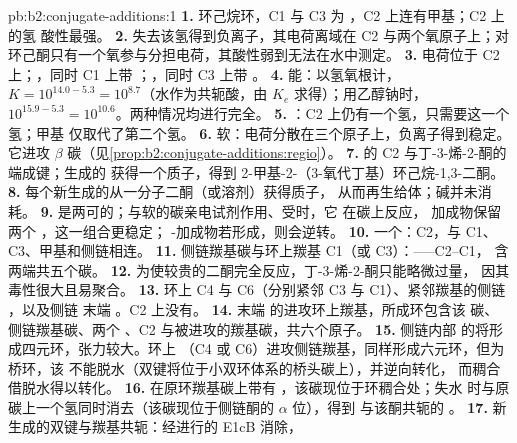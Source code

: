\begin{solution}{pb:b2:conjugate-additions:1}
\textbf{1.} 环己烷环，C1 与 C3 为 ，C2 上连有甲基；C2 上的氢
酸性最强。
\textbf{2.} 失去该氢得到负离子，其电荷离域在 C2 与两个氧原子上；对
环己酮只有一个氧参与分担电荷，其酸性弱到无法在水中测定。
\textbf{3.} 电荷位于 C2 上；，同时 C1 上带 ；，同时 C3 上带 。
\textbf{4.} 能：以氢氧根计，$K = 10^{14.0 - 5.3} = 10^{8.7}$（水作为共轭酸，由
$K_e$ 求得）；用乙醇钠时，$10^{15.9-5.3} = 10^{10.6}$。两种情况均进行完全。
\textbf{5.} ：C2 上仍有一个氢，只需要这一个氢；甲基
仅取代了第二个氢。
\textbf{6.} 软：电荷分散在三个原子上，负离子得到稳定。它进攻
$\beta$ 碳（见\cref{prop:b2:conjugate-additions:regio}）。
\textbf{7.} 的 C2 与丁-3-烯-2-酮的  端成键；生成的
获得一个质子，得到 2-甲基-2-（3-氧代丁基）环己烷-1,3-二酮。
\textbf{8.} 每个新生成的从一分子二酮（或溶剂）获得质子，
从而再生给体；碱并未消耗。
\textbf{9.} 是两可的；与软的碳亲电试剂作用、受时，它
在碳上反应， 加成物保留两个 ，这一组合更稳定；
-加成物若形成，则会逆转。
\textbf{10.} 一个：C2，与 C1、C3、甲基和侧链相连。
\textbf{11.} 侧链羰基碳与环上羰基 C1（或 C3）：------C2--C1，
含两端共五个碳。
\textbf{12.} 为使较贵的二酮完全反应，丁-3-烯-2-酮只能略微过量，
因其毒性很大且易聚合。
\textbf{13.} 环上 C4 与 C6（分别紧邻 C3 与 C1）、紧邻羰基的侧链 ，以及侧链
末端 。C2 上没有。
\textbf{14.} 末端  的进攻环上羰基，所成环包含该
碳、侧链羰基碳、两个 、C2 与被进攻的羰基碳，共六个原子。
\textbf{15.} 侧链内部  的将形成四元环，张力较大。环上
（C4 或 C6）进攻侧链羰基，同样形成六元环，但为桥环，该
不能脱水（双键将位于小双环体系的桥头碳上），并逆向转化，
而稠合借脱水得以转化。
\textbf{16.} 在原环羰基碳上带有 ，该碳现位于环稠合处；失水
时与原  碳上一个氢同时消去（该碳现位于侧链酮的 $\alpha$ 位），得到
与该酮共轭的 。
\textbf{17.} 新生成的双键与羰基共轭：经进行的 E1cB 消除，

\end{solution}
